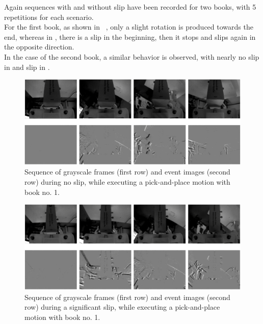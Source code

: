 Again sequences with and without slip have been recorded for two books, with 5 repetitions for each scenario.\\

For the first book, as shown in ~, only a slight rotation is produced towards the end, whereas in , there is a slip in the beginning, then it stops and slips again in the opposite direction.\\

In the case of the second book, a similar behavior is observed, with nearly no slip in  and slip in .

\begin{figure}[H]
    \centering
    \includegraphics[width=\textwidth]{resources/images/set3_case1}
    \caption{Sequence of grayscale frames (first row) and event images (second row) during no slip, while executing a pick-and-place motion with book no. 1.}\label{fig:set3_case1}
\end{figure}

\begin{figure}[H]
    \centering
    \includegraphics[width=\textwidth]{resources/images/set3_case2}
    \caption{Sequence of grayscale frames (first row) and event images (second row) during a significant slip, while executing a pick-and-place motion with book no. 1.}\label{fig:set3_case2}
\end{figure}

